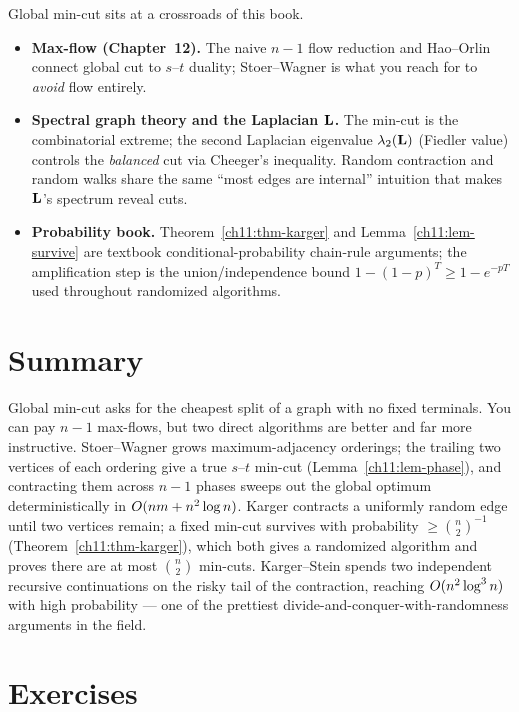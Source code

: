 \begin{connectionbox}
Global min-cut sits at a crossroads of this book.
\begin{itemize}
  \item \textbf{Max-flow (Chapter~12).} The naive $n-1$ flow reduction and Hao--Orlin connect global cut to $s$--$t$ duality; Stoer--Wagner is what you reach for to \emph{avoid} flow entirely.
  \item \textbf{Spectral graph theory and the Laplacian $\mathbf{L}$.} The min-cut is the combinatorial extreme; the second Laplacian eigenvalue $\lambda_2(\mathbf{L})$ (Fiedler value) controls the \emph{balanced} cut via Cheeger's inequality. Random contraction and random walks share the same ``most edges are internal'' intuition that makes $\mathbf{L}$'s spectrum reveal cuts.
  \item \textbf{Probability book.} Theorem~\ref{ch11:thm-karger} and Lemma~\ref{ch11:lem-survive} are textbook conditional-probability chain-rule arguments; the amplification step is the union/independence bound $1-(1-p)^T\ge 1-e^{-pT}$ used throughout randomized algorithms.
\end{itemize}
\end{connectionbox}

\section*{Summary}

Global min-cut asks for the cheapest split of a graph with no fixed terminals. You can pay $n-1$ max-flows, but two direct algorithms are better and far more instructive. Stoer--Wagner grows maximum-adjacency orderings; the trailing two vertices of each ordering give a true $s$--$t$ min-cut (Lemma~\ref{ch11:lem-phase}), and contracting them across $n-1$ phases sweeps out the global optimum deterministically in $O(nm+n^2\log n)$. Karger contracts a uniformly random edge until two vertices remain; a fixed min-cut survives with probability $\ge\binom n2^{-1}$ (Theorem~\ref{ch11:thm-karger}), which both gives a randomized algorithm and proves there are at most $\binom n2$ min-cuts. Karger--Stein spends two independent recursive continuations on the risky tail of the contraction, reaching $O(n^2\log^3 n)$ with high probability --- one of the prettiest divide-and-conquer-with-randomness arguments in the field.

\section{Exercises}

